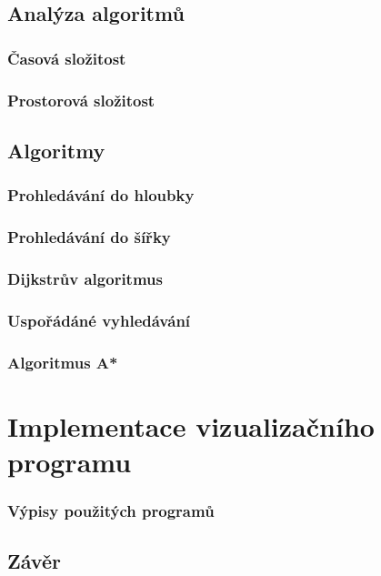 \documentclass[12pt]{report}			%
\begin{document}
		\chapter{Analýza algoritmů}
			\section{Časová složitost}
			
			\section{Prostorová složitost}			
				
		\chapter{Algoritmy}
			\section{Prohledávání do hloubky}
			
			\section{Prohledávání do šířky}
			
			\section{Dijkstrův algoritmus}
			
			\section{Uspořádáné vyhledávání}
			
			\section{Algoritmus A*}
			
	
	\part{Implementace vizualizačního programu}

		\section{Výpisy použitých programů}




	\chapter*{Závěr}
	
\end{document}
